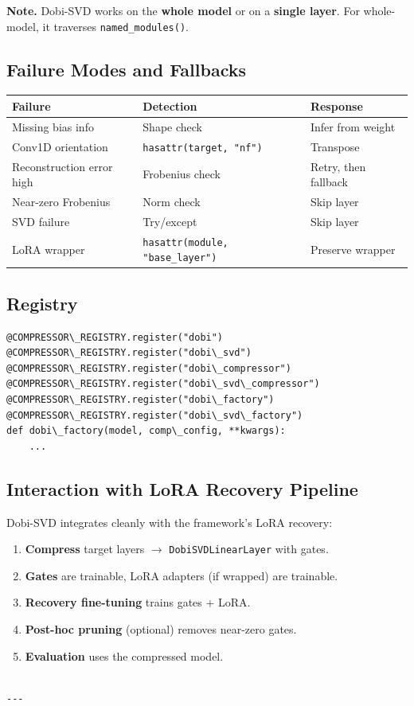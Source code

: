 \textbf{Note.} Dobi-SVD works on the \textbf{whole model} or on a \textbf{single layer}. 
For whole-model, it traverses \texttt{named\_modules()}.

\subsection{Failure Modes and Fallbacks}

\begin{table}[H]
\centering
\small
\begin{tabular}{lll}
\toprule
\textbf{Failure} & \textbf{Detection} & \textbf{Response} \\
\midrule
Missing bias info & Shape check & Infer from weight \\
Conv1D orientation & \texttt{hasattr(target, "nf")} & Transpose \\
Reconstruction error high & Frobenius check & Retry, then fallback \\
Near-zero Frobenius & Norm check & Skip layer \\
SVD failure & Try/except & Skip layer \\
LoRA wrapper & \texttt{hasattr(module, "base\_layer")} & Preserve wrapper \\
\bottomrule
\end{tabular}
\end{table}

\subsection{Registry}

\begin{lstlisting}
@COMPRESSOR\_REGISTRY.register("dobi")
@COMPRESSOR\_REGISTRY.register("dobi\_svd")
@COMPRESSOR\_REGISTRY.register("dobi\_compressor")
@COMPRESSOR\_REGISTRY.register("dobi\_svd\_compressor")
@COMPRESSOR\_REGISTRY.register("dobi\_factory")
@COMPRESSOR\_REGISTRY.register("dobi\_svd\_factory")
def dobi\_factory(model, comp\_config, **kwargs):
    ...
\end{lstlisting}

\subsection{Interaction with LoRA Recovery Pipeline}

Dobi-SVD integrates cleanly with the framework's LoRA recovery:

\begin{enumerate}
\item \textbf{Compress} target layers $\to$ \texttt{DobiSVDLinearLayer} with gates.
\item \textbf{Gates} are trainable, LoRA adapters (if wrapped) are trainable.
\item \textbf{Recovery fine-tuning} trains gates + LoRA.
\item \textbf{Post-hoc pruning} (optional) removes near-zero gates.
\item \textbf{Evaluation} uses the compressed model.
\end{enumerate}
\begin{lstlisting}

---
\end{lstlisting}

